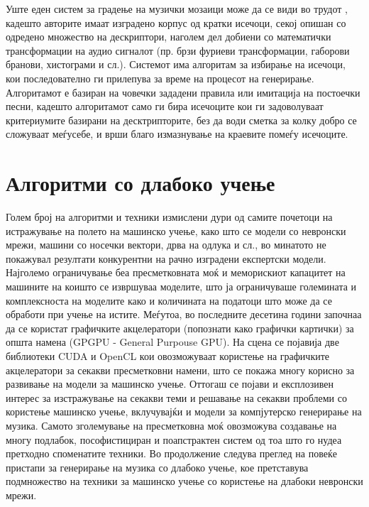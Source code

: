 Уште еден систем за градење на музички мозаици може да се види во трудот \cite{Schwarz2006}, кадешто авторите имаат изградено корпус од кратки исечоци, секој опишан со одредено множество на дескриптори, наголем дел добиени со математички трансформации на аудио сигналот (пр. брзи фуриеви трансформации, габорови бранови, хистограми и сл.). Системот има алгоритам за избирање на исечоци, кои последователно ги прилепува за време на процесот на генерирање. Алгоритамот е базиран на човечки зададени правила или имитација на постоечки песни, кадешто алгоритамот само ги бира исечоците кои ги задоволуваат критериумите базирани на десктрипторите, без да води сметка за колку добро се сложуваат меѓусебе, и врши благо измазнување на краевите помеѓу исечоците.

\section{Алгоритми со длабоко учење} 

Голем број на алгоритми и техники измислени дури од самите почетоци на истражување на полето на машинско учење, како што се модели со невронски мрежи, машини со носечки вектори, дрва на одлука и сл., во минатото не покажувал резултати конкурентни на рачно изградени експертски модели. Најголемо ограничување беа пресметковната моќ и меморискиот капацитет на машините на коишто се извршуваа моделите, што ја ограничуваше големината и комплексноста на моделите како и количината на податоци што може да се обработи при учење на истите. Меѓутоа, во последните десетина години започнаа да се користат графичките акцелератори (попознати како графички картички) за општа намена (GPGPU - General Purpouse GPU). На сцена се појавија две библиотеки CUDA и OpenCL кои овозможуваат користење на графичките акцелератори за секакви пресметковни намени, што се покажа многу корисно за развивање на модели за машинско учење. Оттогаш се појави и експлозивен интерес за изстражување на секакви теми и решавање на секакви проблеми со користење машинско учење, вклучувајќи и модели за компјутерско генерирање на музика. Самото зголемување на пресметковна моќ овозможува создавање на многу подлабок, пософистициран и поапстрактен систем од тоа што го нудеа претходно споменатите техники. Во продолжение следува преглед на повеќе пристапи за генерирање на музика со длабоко учење, кое претставува подмножество на техники за машинско учење со користење на длабоки невронски мрежи.

